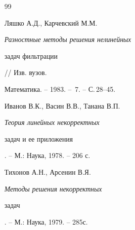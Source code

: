 \begin{thebibliography}{99}


Ляшко А.Д., Карчевский М.М. {\em Разностные методы решения нелинейных


задач фильтрации} // Изв. вузов.


Математика. -- 1983. -- \No\,7. -- С.\,28--45.




Иванов В.К., Васин В.В., Танана В.П. {\em Теория линейных некорректных


 задач и ее приложения}. -- М.: Наука, 1978. -- 206 с.




Тихонов А.Н., Арсенин В.Я. {\em Методы решения некорректных


задач}. -- М.: Наука, 1979. -- 285с.





\end{thebibliography}





\vskip 2cm












\label{end}





